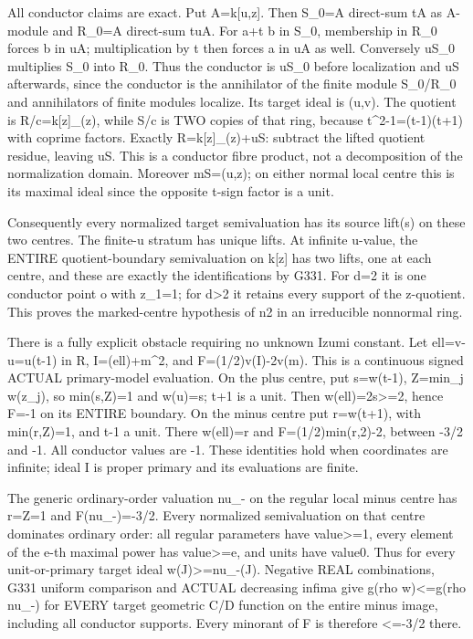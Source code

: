 \documentclass[11pt]{article}
\begin{document}
All conductor claims are exact. Put A=k[u,z]. Then S\_0=A direct-sum tA as A-module and R\_0=A direct-sum tuA. For a+t b in S\_0, membership in R\_0 forces b in uA; multiplication by t then forces a in uA as well. Conversely uS\_0 multiplies S\_0 into R\_0. Thus the conductor is uS\_0 before localization and uS afterwards, since the conductor is the annihilator of the finite module S\_0/R\_0 and annihilators of finite modules localize. Its target ideal is (u,v). The quotient is R/c=k[z]\_(z), while S/c is TWO copies of that ring, because t\textasciicircum{}2-1=(t-1)(t+1) with coprime factors. Exactly R=k[z]\_(z)+uS: subtract the lifted quotient residue, leaving uS. This is a conductor fibre product, not a decomposition of the normalization domain. Moreover mS=(u,z); on either normal local centre this is its maximal ideal since the opposite t-sign factor is a unit.

Consequently every normalized target semivaluation has its source lift(s) on these two centres. The finite-u stratum has unique lifts. At infinite u-value, the ENTIRE quotient-boundary semivaluation on k[z] has two lifts, one at each centre, and these are exactly the identifications by G331. For d=2 it is one conductor point o with z\_1=1; for d\textgreater{}2 it retains every support of the z-quotient. This proves the marked-centre hypothesis of n2 in an irreducible nonnormal ring.

There is a fully explicit obstacle requiring no unknown Izumi constant. Let ell=v-u=u(t-1) in R, I=(ell)+m\textasciicircum{}2, and F=(1/2)v(I)-2v(m). This is a continuous signed ACTUAL primary-model evaluation. On the plus centre, put s=w(t-1), Z=min\_j w(z\_j), so min(s,Z)=1 and w(u)=s; t+1 is a unit. Then w(ell)=2s\textgreater{}=2, hence F=-1 on its ENTIRE boundary. On the minus centre put r=w(t+1), with min(r,Z)=1, and t-1 a unit. There w(ell)=r and F=(1/2)min(r,2)-2, between -3/2 and -1. All conductor values are -1. These identities hold when coordinates are infinite; ideal I is proper primary and its evaluations are finite.

The generic ordinary-order valuation nu\_- on the regular local minus centre has r=Z=1 and F(nu\_-)=-3/2. Every normalized semivaluation on that centre dominates ordinary order: all regular parameters have value\textgreater{}=1, every element of the e-th maximal power has value\textgreater{}=e, and units have value0. Thus for every unit-or-primary target ideal w(J)\textgreater{}=nu\_-(J). Negative REAL combinations, G331 uniform comparison and ACTUAL decreasing infima give g(rho w)\textless{}=g(rho nu\_-) for EVERY target geometric C/D function on the entire minus image, including all conductor supports. Every minorant of F is therefore \textless{}=-3/2 there.
\end{document}
